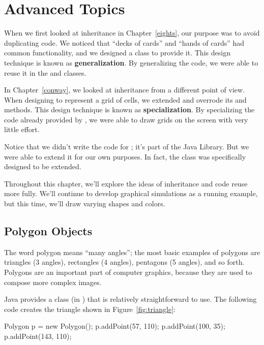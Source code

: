 \chapter{Advanced Topics}


When we first looked at inheritance in Chapter~\ref{eights}, our purpose was to avoid duplicating code.
We noticed that ``decks of cards'' and ``hands of cards'' had common functionality, and we designed a  class to provide it.
This design technique is known as {\bf generalization}.
By generalizing the code, we were able to reuse it in the  and  classes.


In Chapter~\ref{conway}, we looked at inheritance from a different point of view.
When designing  to represent a grid of cells, we extended  and overrode its  and  methods.
This design technique is known as {\bf specialization}.
By specializing the code already provided by , we were able to draw grids on the screen with very little effort.

Notice that we didn't write the code for ; it's part of the Java Library.
But we were able to extend it for our own purposes.
In fact, the  class was specifically designed to be extended.

Throughout this chapter, we'll explore the ideas of inheritance and code reuse more fully.
We'll continue to develop graphical simulations as a running example, but this time, we'll draw varying shapes and colors.


\section{Polygon Objects}

The word polygon means ``many angles''; the most basic examples of polygons are triangles (3 angles), rectangles (4 angles), pentagons (5 angles), and so forth.
Polygons are an important part of computer graphics, because they are used to compose more complex images.

Java provides a  class (in ) that is relatively straightforward to use.
The following code creates the triangle shown in Figure~\ref{fig:triangle}:

\begin{code}
Polygon p = new Polygon();
p.addPoint(57, 110);
p.addPoint(100, 35);
p.addPoint(143, 110);
\end{code}

